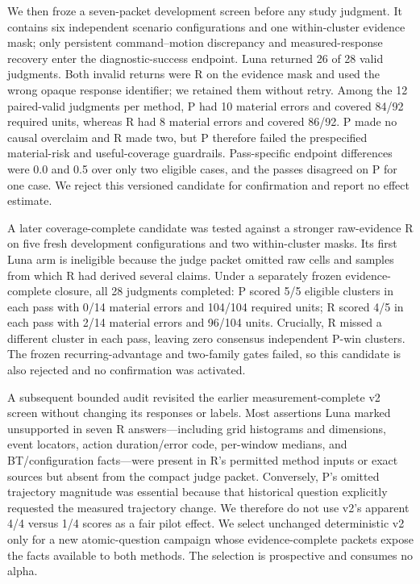 \documentclass[conference]{IEEEtran}
\begin{document}
We then froze a seven-packet development screen before any study judgment. It contains six
independent scenario configurations and one within-cluster evidence mask; only persistent
command--motion discrepancy and measured-response recovery enter the diagnostic-success endpoint.
Luna returned 26 of 28 valid judgments. Both invalid returns were R on the evidence mask and used
the wrong opaque response identifier; we retained them without retry. Among the 12 paired-valid
judgments per method, P had 10 material errors and covered 84/92 required units, whereas R had
8 material errors and covered 86/92. P made no causal overclaim and R made two, but P therefore
failed the prespecified material-risk and useful-coverage guardrails. Pass-specific endpoint
differences were 0.0 and 0.5 over only two eligible cases, and the passes disagreed on P for one
case. We reject this versioned candidate for confirmation and report no effect estimate.

A later coverage-complete candidate was tested against a stronger raw-evidence R on five fresh
development configurations and two within-cluster masks. Its first Luna arm is ineligible because
the judge packet omitted raw cells and samples from which R had derived several claims. Under a
separately frozen evidence-complete closure, all 28 judgments completed: P scored 5/5 eligible
clusters in each pass with 0/14 material errors and 104/104 required units; R scored 4/5 in each
pass with 2/14 material errors and 96/104 units. Crucially, R missed a different cluster in each
pass, leaving zero consensus independent P-win clusters. The frozen recurring-advantage and
two-family gates failed, so this candidate is also rejected and no confirmation was activated.

A subsequent bounded audit revisited the earlier measurement-complete v2 screen without changing
its responses or labels. Most assertions Luna marked unsupported in seven R answers---including
grid histograms and dimensions, event locators, action duration/error code, per-window medians,
and BT/configuration facts---were present in R's permitted method inputs or exact sources but absent
from the compact judge packet. Conversely, P's omitted trajectory magnitude was essential because
that historical question explicitly requested the measured trajectory change. We therefore do not
use v2's apparent 4/4 versus 1/4 scores as a fair pilot effect. We select unchanged deterministic
v2 only for a new atomic-question campaign whose evidence-complete packets expose the facts
available to both methods. The selection is prospective and consumes no alpha.
\end{document}
